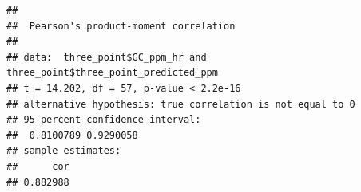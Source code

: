 \documentclass[
]{article}
\newenvironment{Shaded}{\begin{snugshade}}{\end{snugshade}}
\newcommand{\AttributeTok}[1]{\textcolor[rgb]{0.13,0.29,0.53}{#1}}
\newcommand{\FunctionTok}[1]{\textcolor[rgb]{0.13,0.29,0.53}{\textbf{#1}}}
\newcommand{\NormalTok}[1]{#1}
\newcommand{\OtherTok}[1]{\textcolor[rgb]{0.56,0.35,0.01}{#1}}
\newcommand{\SpecialCharTok}[1]{\textcolor[rgb]{0.81,0.36,0.00}{\textbf{#1}}}
\newcommand{\StringTok}[1]{\textcolor[rgb]{0.31,0.60,0.02}{#1}}
\begin{document}
\begin{Shaded}
\end{Shaded}

\begin{verbatim}
## 
##  Pearson's product-moment correlation
## 
## data:  three_point$GC_ppm_hr and three_point$three_point_predicted_ppm
## t = 14.202, df = 57, p-value < 2.2e-16
## alternative hypothesis: true correlation is not equal to 0
## 95 percent confidence interval:
##  0.8100789 0.9290058
## sample estimates:
##      cor 
## 0.882988
\end{verbatim}
\end{document}
